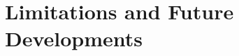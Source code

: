 \chapter{Limitations and Future Developments}\label{limitations}\label{futures}\label{section \thechapter}
